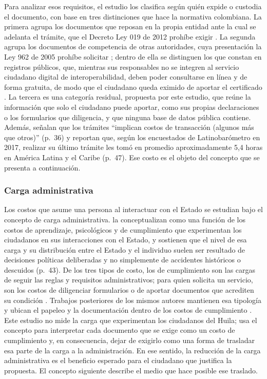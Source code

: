 Para analizar esos requisitos, el estudio los clasifica según quién expide o custodia el documento, con base en tres distinciones que hace la normativa colombiana. La primera agrupa los documentos que reposan en la propia entidad ante la cual se adelanta el trámite, que el Decreto Ley 019 de 2012 prohíbe exigir \parencite[art.~9]{colombia2012decreto019}. La segunda agrupa los documentos de competencia de otras autoridades, cuya presentación la Ley 962 de 2005 prohíbe solicitar \parencite[art.~1, num.~1]{colombia2005ley962}; dentro de ella se distinguen los que constan en registros públicos, que, mientras sus responsables no se integren al servicio ciudadano digital de interoperabilidad, deben poder consultarse en línea y de forma gratuita, de modo que el ciudadano queda eximido de aportar el certificado \parencite[art.~10, par.~3]{colombia2019decreto2106}. La tercera es una categoría residual, propuesta por este estudio, que reúne la información que solo el ciudadano puede aportar, como sus propias declaraciones o los formularios que diligencia, y que ninguna base de datos pública contiene. Además, \textcite{roseth2018complicada} señalan que los trámites \enquote{implican costos de transacción (algunos más que otros)} (p.~36) y reportan que, según los encuestados de Latinobarómetro en 2017, realizar su último trámite les tomó en promedio aproximadamente 5,4 horas en América Latina y el Caribe (p.~47). Ese costo es el objeto del concepto que se presenta a continuación.

\subsubsection{Carga administrativa}

Los costos que asume una persona al interactuar con el Estado se estudian bajo el concepto de carga administrativa. \textcite{moynihan2015administrative} la conceptualizan como una función de los costos de aprendizaje, psicológicos y de cumplimiento que experimentan los ciudadanos en sus interacciones con el Estado, y sostienen que el nivel de esa carga y su distribución entre el Estado y el individuo suelen ser resultado de decisiones políticas deliberadas y no simplemente de accidentes históricos o descuidos (p.~43). De los tres tipos de costo, los de cumplimiento son las cargas de seguir las reglas y requisitos administrativos; para quien solicita un servicio, son los costos de diligenciar formularios o de aportar documentos que acrediten su condición \parencite[p.~46]{moynihan2015administrative}. Trabajos posteriores de los mismos autores mantienen esa tipología y ubican el papeleo y la documentación dentro de los costos de cumplimiento \parencite{herd2025administrative} . Este estudio no mide la carga que experimentan los ciudadanos del Huila; usa el concepto para interpretar cada documento que se exige como un costo de cumplimiento y, en consecuencia, dejar de exigirlo como una forma de trasladar esa parte de la carga a la administración. En ese sentido, la reducción de la carga administrativa es el beneficio esperado para el ciudadano que justifica la propuesta. El concepto siguiente describe el medio que hace posible ese traslado.

